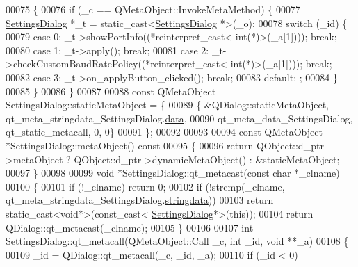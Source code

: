 \begin{DoxyCode}
00075 \{
00076     \textcolor{keywordflow}{if} (\_c == QMetaObject::InvokeMetaMethod) \{
00077         \hyperlink{a00075}{SettingsDialog} *\_t = \textcolor{keyword}{static\_cast<}\hyperlink{a00075}{SettingsDialog} *\textcolor{keyword}{>}(\_o);
00078         \textcolor{keywordflow}{switch} (\_id) \{
00079         \textcolor{keywordflow}{case} 0: \_t->showPortInfo((*\textcolor{keyword}{reinterpret\_cast<} \textcolor{keywordtype}{int}(*)\textcolor{keyword}{>}(\_a[1]))); \textcolor{keywordflow}{break};
00080         \textcolor{keywordflow}{case} 1: \_t->apply(); \textcolor{keywordflow}{break};
00081         \textcolor{keywordflow}{case} 2: \_t->checkCustomBaudRatePolicy((*\textcolor{keyword}{reinterpret\_cast<} \textcolor{keywordtype}{int}(*)\textcolor{keyword}{>}(\_a[1]))); \textcolor{keywordflow}{break};
00082         \textcolor{keywordflow}{case} 3: \_t->on\_applyButton\_clicked(); \textcolor{keywordflow}{break};
00083         \textcolor{keywordflow}{default}: ;
00084         \}
00085     \}
00086 \}
00087 
00088 \textcolor{keyword}{const} QMetaObject SettingsDialog::staticMetaObject = \{
00089     \{ &QDialog::staticMetaObject, qt\_meta\_stringdata\_SettingsDialog.\hyperlink{a00069_a320edc752a589bd0171189d51579680e}{data},
00090       qt\_meta\_data\_SettingsDialog,  qt\_static\_metacall, 0, 0\}
00091 \};
00092 
00093 
00094 \textcolor{keyword}{const} QMetaObject *SettingsDialog::metaObject()\textcolor{keyword}{ const}
00095 \textcolor{keyword}{}\{
00096     \textcolor{keywordflow}{return} QObject::d\_ptr->metaObject ? QObject::d\_ptr->dynamicMetaObject() : &staticMetaObject;
00097 \}
00098 
00099 \textcolor{keywordtype}{void} *SettingsDialog::qt\_metacast(\textcolor{keyword}{const} \textcolor{keywordtype}{char} *\_clname)
00100 \{
00101     \textcolor{keywordflow}{if} (!\_clname) \textcolor{keywordflow}{return} 0;
00102     \textcolor{keywordflow}{if} (!strcmp(\_clname, qt\_meta\_stringdata\_SettingsDialog.\hyperlink{a00069_ab803985b8fecb8e67a35ab5a3939845b}{stringdata}))
00103         \textcolor{keywordflow}{return} \textcolor{keyword}{static\_cast<}\textcolor{keywordtype}{void}*\textcolor{keyword}{>}(\textcolor{keyword}{const\_cast<} \hyperlink{a00075}{SettingsDialog}*\textcolor{keyword}{>}(\textcolor{keyword}{this}));
00104     \textcolor{keywordflow}{return} QDialog::qt\_metacast(\_clname);
00105 \}
00106 
00107 \textcolor{keywordtype}{int} SettingsDialog::qt\_metacall(QMetaObject::Call \_c, \textcolor{keywordtype}{int} \_id, \textcolor{keywordtype}{void} **\_a)
00108 \{
00109     \_id = QDialog::qt\_metacall(\_c, \_id, \_a);
00110     \textcolor{keywordflow}{if} (\_id < 0)

\end{DoxyCode}
